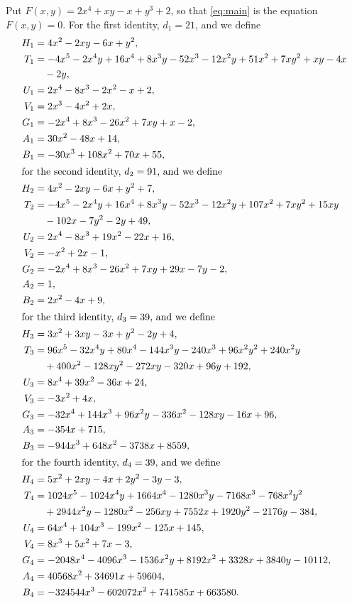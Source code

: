 \documentclass[11pt]{article}
\begin{document}
Put $F(x,y)=2x^{4}+xy-x+y^{3}+2$, so that \eqref{eq:main} is the equation $F(x,y)=0$.
For the first identity, $d_{1}=21$, and we define
\begin{align*}
H_{1}&=4x^{2}-2xy-6x+y^{2},\\
T_{1}&=-4x^{5}-2x^{4}y+16x^{4}+8x^{3}y-52x^{3}-12x^{2}y+51x^{2}+7xy^{2}+xy-4x\\
&\quad-2y,\\
U_{1}&=2x^{4}-8x^{3}-2x^{2}-x+2,\\
V_{1}&=2x^{3}-4x^{2}+2x,\\
G_{1}&=-2x^{4}+8x^{3}-26x^{2}+7xy+x-2,\\
A_{1}&=30x^{2}-48x+14,\\
B_{1}&=-30x^{3}+108x^{2}+70x+55,\\
\intertext{for the second identity, $d_{2}=91$, and we define}
H_{2}&=4x^{2}-2xy-6x+y^{2}+7,\\
T_{2}&=-4x^{5}-2x^{4}y+16x^{4}+8x^{3}y-52x^{3}-12x^{2}y+107x^{2}+7xy^{2}+15xy\\
&\quad-102x-7y^{2}-2y+49,\\
U_{2}&=2x^{4}-8x^{3}+19x^{2}-22x+16,\\
V_{2}&=-x^{2}+2x-1,\\
G_{2}&=-2x^{4}+8x^{3}-26x^{2}+7xy+29x-7y-2,\\
A_{2}&=1,\\
B_{2}&=2x^{2}-4x+9,\\
\intertext{for the third identity, $d_{3}=39$, and we define}
H_{3}&=3x^{2}+3xy-3x+y^{2}-2y+4,\\
T_{3}&=96x^{5}-32x^{4}y+80x^{4}-144x^{3}y-240x^{3}+96x^{2}y^{2}+240x^{2}y\\
&\quad+400x^{2}-128xy^{2}-272xy-320x+96y+192,\\
U_{3}&=8x^{4}+39x^{2}-36x+24,\\
V_{3}&=-3x^{2}+4x,\\
G_{3}&=-32x^{4}+144x^{3}+96x^{2}y-336x^{2}-128xy-16x+96,\\
A_{3}&=-354x+715,\\
B_{3}&=-944x^{3}+648x^{2}-3738x+8559,\\
\intertext{for the fourth identity, $d_{4}=39$, and we define}
H_{4}&=5x^{2}+2xy-4x+2y^{2}-3y-3,\\
T_{4}&=1024x^{5}-1024x^{4}y+1664x^{4}-1280x^{3}y-7168x^{3}-768x^{2}y^{2}\\
&\quad+2944x^{2}y-1280x^{2}-256xy+7552x+1920y^{2}-2176y-384,\\
U_{4}&=64x^{4}+104x^{3}-199x^{2}-125x+145,\\
V_{4}&=8x^{3}+5x^{2}+7x-3,\\
G_{4}&=-2048x^{4}-4096x^{3}-1536x^{2}y+8192x^{2}+3328x+3840y-10112,\\
A_{4}&=40568x^{2}+34691x+59604,\\
B_{4}&=-324544x^{3}-602072x^{2}+741585x+663580.
\end{align*}
\end{document}
